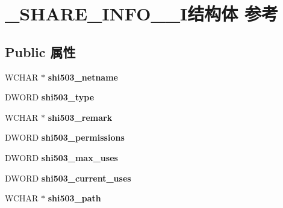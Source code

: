 \hypertarget{struct___s_h_a_r_e___i_n_f_o__503___i}{}\section{\+\_\+\+S\+H\+A\+R\+E\+\_\+\+I\+N\+F\+O\+\_\+\_\+\+I结构体 参考}
\label{struct___s_h_a_r_e___i_n_f_o__503___i}
\subsection*{Public 属性}
\begin{DoxyCompactItemize}
\item 
\mbox{\label{struct___s_h_a_r_e___i_n_f_o__503___i_a5098d554e53aca897e4feb632ae6f542}} 
W\+C\+H\+AR $\ast$ {\bfseries shi503\+\_\+netname}
\item 
\mbox{\label{struct___s_h_a_r_e___i_n_f_o__503___i_a7c6d42bdee53f855afcdc79b444a7e5e}} 
D\+W\+O\+RD {\bfseries shi503\+\_\+type}
\item 
\mbox{\label{struct___s_h_a_r_e___i_n_f_o__503___i_abb1575c4e38da8d90f6f6ed450b2df88}} 
W\+C\+H\+AR $\ast$ {\bfseries shi503\+\_\+remark}
\item 
\mbox{\label{struct___s_h_a_r_e___i_n_f_o__503___i_adfb0b7e6613712427cdc4e3b46e6428d}} 
D\+W\+O\+RD {\bfseries shi503\+\_\+permissions}
\item 
\mbox{\label{struct___s_h_a_r_e___i_n_f_o__503___i_a402d1cd24a216ebb3a42df98486748d6}} 
D\+W\+O\+RD {\bfseries shi503\+\_\+max\+\_\+uses}
\item 
\mbox{\label{struct___s_h_a_r_e___i_n_f_o__503___i_a1144fd4608b4d0c0eb8b15bee267343b}} 
D\+W\+O\+RD {\bfseries shi503\+\_\+current\+\_\+uses}
\item 
\mbox{\label{struct___s_h_a_r_e___i_n_f_o__503___i_a9b4967421efb081b635b0b30e336191b}} 
W\+C\+H\+AR $\ast$ {\bfseries shi503\+\_\+path}
\item 

\end{DoxyCompactItemize}
